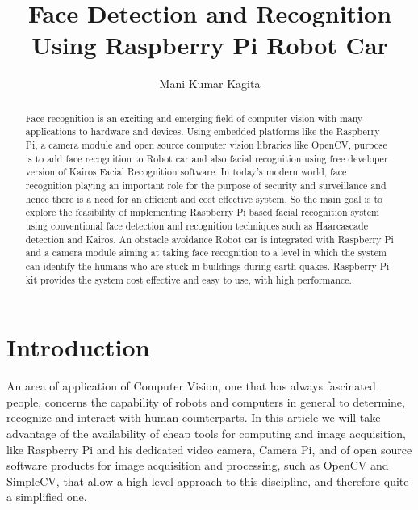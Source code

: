 \documentclass[sigconf]{acmart}
\begin{document}
\title{Face Detection and Recognition Using Raspberry Pi Robot Car}

\author{Mani Kumar Kagita}


\begin{abstract}
Face recognition is an exciting and emerging field of computer vision with many  applications to hardware and devices. Using embedded platforms like the Raspberry Pi, a camera module and open source computer vision libraries like OpenCV, purpose is to add face recognition to Robot car and also facial recognition using free developer version of Kairos Facial Recognition software.
In today's modern world, face recognition playing an important role for the purpose of security and surveillance and hence there is a need for an efficient and cost effective system. So the main goal is to explore the feasibility of implementing Raspberry Pi based facial recognition system using conventional face detection and recognition techniques such as Haarcascade detection and Kairos. An obstacle avoidance Robot car is integrated with Raspberry Pi and a camera module aiming at taking face recognition to a level in which the system can identify the humans who are stuck in buildings during earth quakes.  Raspberry Pi kit provides the system cost effective and easy to use, with high performance.

\end{abstract}


\maketitle

\section{Introduction}
An area of application of Computer Vision, one that has always fascinated people, concerns the capability of robots and computers in general to determine, recognize and interact with human counterparts. In this article we will take advantage of the availability of cheap tools for computing and image acquisition, like Raspberry Pi and his dedicated video camera, Camera Pi, and of open source software products for image acquisition and processing, such as OpenCV and SimpleCV, that allow a high level approach to this discipline, and therefore quite a simplified one.
\end{document}
